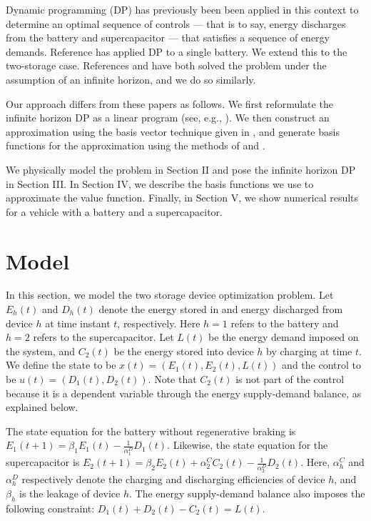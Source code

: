 \documentclass[conference]{IEEEtran}
\begin{document}
Dynamic programming (DP) has previously been been applied in this context to determine an optimal sequence of controls --- that is to say, energy discharges from the battery and supercapacitor --- that satisfies a sequence of energy demands. Reference \cite{su2013modeling} has applied DP to a single battery. We extend this to the two-storage case. References \cite{8330176} and \cite{8315074} have both solved the problem under the assumption of an infinite horizon, and we do so similarly.

Our approach differs from these papers as follows. We first reformulate the infinite horizon DP as a linear program (see, e.g., \cite{Bertsekas:2007:DPO:1396348}). We then construct an approximation using the basis vector technique given in \cite{deFarias:2003:LPA:970869.970918}, and generate basis functions for the approximation using the methods of \cite{Bellman:1957} and \cite{Bellman1962}. %

We physically model the problem in Section II and pose the infinite horizon DP in Section III. In Section IV, we describe the basis functions we use to approximate the value function. Finally, in Section V, we show numerical results for a vehicle with a battery and a supercapacitor. 


\section{Model}
In this section, we model the two storage device optimization problem. Let $E_{h}(t)$ and $D_{h}(t)$ denote the energy stored in and energy discharged from device $h$ at time instant $t$, respectively. Here $h=1$ refers to the battery and $h=2$ refers to the supercapacitor. Let $L(t)$ be the energy demand imposed on the system, and $C_{2}(t)$ be the energy stored into device $h$ by charging at time $t$. We define the state to be $x(t)=(E_{1}(t),E_{2}(t),L(t))$ and the control to be $u(t)=(D_{1}(t),D_{2}(t))$. Note that $C_{2}(t)$ is not part of the control because it is a dependent variable through the energy supply-demand balance, as explained below.

The state equation for the battery without regenerative braking is \begin{math}E_{1}(t+1)=\beta_{1}E_{1}(t)-\frac{1}{\alpha_{1}^{D}}D_{1}(t)\end{math}. Likewise, the state equation for the supercapacitor is \begin{math}E_{2}(t+1)=\beta_{2}E_{2}(t)+\alpha_{2}^{C}C_{2}(t)-\frac{1}{\alpha_{2}^{D}}D_{2}(t)\end{math}. Here, $\alpha^{C}_{h}$ and $\alpha^{D}_{h}$ respectively denote the charging and discharging efficiencies of device $h$, and $\beta_{h}$ is the leakage of device $h$. The energy supply-demand balance also imposes the following constraint: $D_{1}(t) + D_{2}(t) - C_{2}(t) = L(t)$. %
\end{document}
